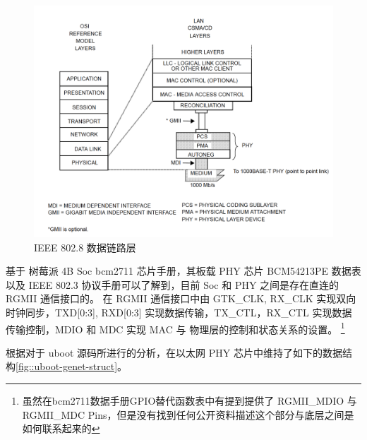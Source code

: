    \begin{figure}[ht]
        \centering
        \caption{IEEE 802.8 数据链路层}    \label{fig::dataLink}
        \includegraphics[scale=0.4]{imgs/data_link_layers.jpg}
    \end{figure}

    基于 树莓派 4B Soc bcm2711 芯片手册，其板载 PHY 芯片 BCM54213PE 数据表以及 IEEE 802.3 协议手册可以了解到，目前 Soc 和 PHY 之间是存在直连的 RGMII 通信接口的。
    在 RGMII 通信接口中由 GTK\_CLK, RX\_CLK 实现双向时钟同步，TXD[0:3], RXD[0:3] 实现数据传输，TX\_CTL，RX\_CTL 实现数据传输控制，MDIO 和 MDC 实现 MAC 与 物理层的控制和状态关系的设置。
    \footnote{虽然在bcm2711数据手册GPIO替代函数表中有提到提供了 RGMII\_MDIO 与 RGMII\_MDC Pins，但是没有找到任何公开资料描述这个部分与底层之间是如何联系起来的}



    根据对于 uboot 源码所进行的分析，在以太网 PHY 芯片中维持了如下的数据结构\ref{fig::uboot-genet-struct}。

